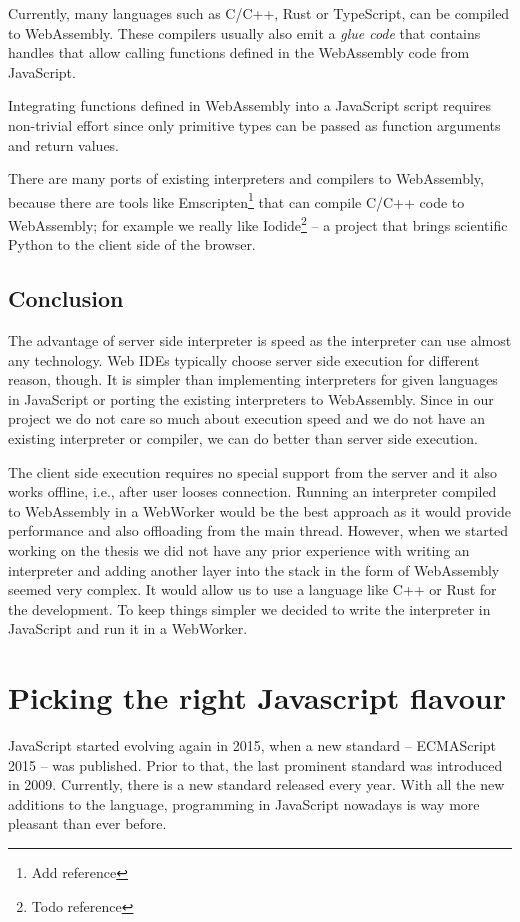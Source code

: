 Currently, many languages such as C/C++, Rust or TypeScript, can be compiled to WebAssembly. These compilers usually also emit
a \emph{glue code} that contains handles that allow calling functions defined in the WebAssembly code from JavaScript.

Integrating functions defined in WebAssembly into a JavaScript script requires non-trivial effort since only primitive types can be passed
as function arguments and return values.

There are many ports of existing interpreters and compilers to WebAssembly, because there are tools like Emscripten\footnote{Add reference}
that can compile C/C++ code to WebAssembly; for example we really like Iodide\footnote{Todo reference} -- a project that brings scientific Python
to the client side of the browser.

\subsection{Conclusion}
The advantage of server side interpreter is speed as the interpreter can use almost any technology. Web IDEs typically choose
server side execution for different reason, though. It is simpler than implementing interpreters for given languages in JavaScript or
porting the existing interpreters to WebAssembly. Since in our project we do not care so much about execution speed and
we do not have an existing interpreter or compiler, we can do better than server side execution.

The client side execution requires no special support from the server and it also works offline, i.e., after user looses connection. Running an interpreter
compiled to WebAssembly in a WebWorker would be the best approach as it would provide performance and also offloading from the main thread.
However, when we started working on the thesis we did not have any prior experience with writing an interpreter and adding another layer into the stack in the
form of WebAssembly seemed very complex. It would allow us to use a language like C++ or Rust for the development. To keep things simpler we
decided to write the interpreter in JavaScript and run it in a WebWorker.

\section{Picking the right Javascript flavour}
JavaScript started evolving again in 2015, when a new standard -- ECMAScript 2015 -- was published. Prior to that, the last prominent
standard was introduced in 2009. Currently, there is a new standard released every year. With all the new additions to the language, programming in
JavaScript nowadays is way more pleasant than ever before.


